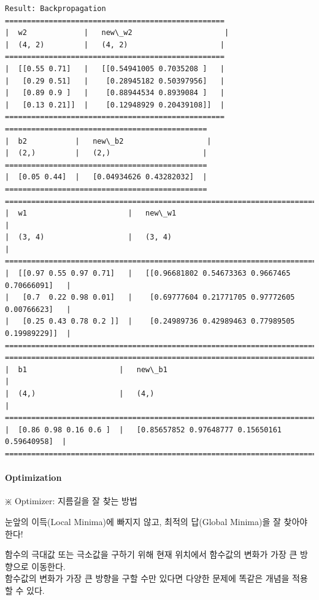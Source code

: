 \documentclass[11pt]{article}
\begin{document}
\begin{Verbatim}[commandchars=\\\{\}]
Result: Backpropagation
==================================================
|  w2             |   new\_w2                     |
|  (4, 2)         |   (4, 2)                     |
==================================================
|  [[0.55 0.71]   |   [[0.54941005 0.7035208 ]   |
|   [0.29 0.51]   |    [0.28945182 0.50397956]   |
|   [0.89 0.9 ]   |    [0.88944534 0.8939084 ]   |
|   [0.13 0.21]]  |    [0.12948929 0.20439108]]  |
==================================================
==============================================
|  b2           |   new\_b2                   |
|  (2,)         |   (2,)                     |
==============================================
|  [0.05 0.44]  |   [0.04934626 0.43282032]  |
==============================================
==================================================================================
|  w1                       |   new\_w1                                           |
|  (3, 4)                   |   (3, 4)                                           |
==================================================================================
|  [[0.97 0.55 0.97 0.71]   |   [[0.96681802 0.54673363 0.9667465  0.70666091]   |
|   [0.7  0.22 0.98 0.01]   |    [0.69777604 0.21771705 0.97772605 0.00766623]   |
|   [0.25 0.43 0.78 0.2 ]]  |    [0.24989736 0.42989463 0.77989505 0.19989229]]  |
==================================================================================
==============================================================================
|  b1                     |   new\_b1                                         |
|  (4,)                   |   (4,)                                           |
==============================================================================
|  [0.86 0.98 0.16 0.6 ]  |   [0.85657852 0.97648777 0.15650161 0.59640958]  |
==============================================================================

    \end{Verbatim}

    \hypertarget{optimization}{%
\paragraph{Optimization}\label{optimization}}

\(\divideontimes\) Optimizer: 지름길을 잘 찾는 방법

 눈앞의 이득(Local Minima)에 빠지지 않고, 최적의 답(Global Minima)을 잘
찾아야 한다!

함수의 극대값 또는 극소값을 구하기 위해 현재 위치에서 함수값의 변화가
가장 큰 방향으로 이동한다.\\
함수값의 변화가 가장 큰 방향을 구할 수만 있다면 다양한 문제에 똑같은
개념을 적용할 수 있다.
\end{document}
